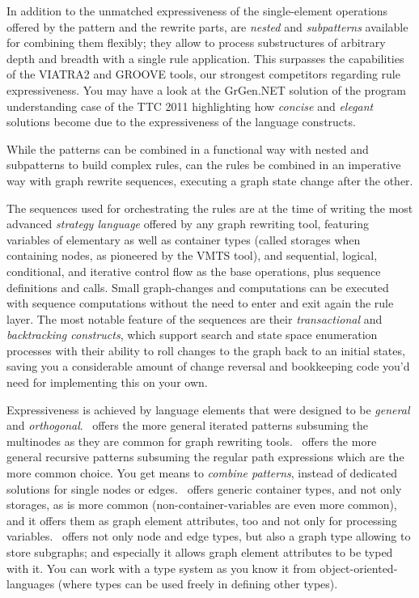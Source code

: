 In addition to the unmatched expressiveness of the single-element operations offered by the pattern and the rewrite parts,
are \emph{nested} and \emph{subpatterns} available for combining them flexibly;
they allow to process substructures of arbitrary depth and breadth with a single rule application.
This surpasses the capabilities of the VIATRA2\cite{viatra2,recursiveviatra} and GROOVE \cite{Groove} tools, our strongest competitors regarding rule expressiveness.
You may have a look at the GrGen.NET solution of the program understanding case \cite{ProgramUnderstanding} of the TTC 2011 highlighting how \emph{concise} and \emph{elegant} solutions become due to the expressiveness of the language constructs.

While the patterns can be combined in a functional way with nested and subpatterns to build complex rules, can the rules be combined in an imperative way with graph rewrite sequences, executing a graph state change after the other.

The sequences used for orchestrating the rules are at the time of writing the most advanced \emph{strategy language} offered by any graph rewriting tool, featuring variables of elementary as well as container types (called storages when containing nodes, as pioneered by the VMTS\cite{vmts} tool), and sequential, logical, conditional, and iterative control flow as the base operations, plus sequence definitions and calls.
Small graph-changes and computations can be executed with sequence computations without the need to enter and exit again the rule layer.
The most notable feature of the sequences are their \emph{transactional} and \emph{backtracking constructs}, which support search and state space enumeration processes with their ability to roll changes to the graph back to an initial states, saving you a considerable amount of change reversal and bookkeeping code you'd need for implementing this on your own.

Expressiveness is achieved by language elements that were designed to be \emph{general} and \emph{orthogonal}.
\GrG\ offers the more general iterated patterns subsuming the multinodes as they are common for graph rewriting tools.
\GrG\ offers the more general recursive patterns subsuming the regular path expressions which are the more common choice.
You get means to \emph{combine patterns}, instead of dedicated solutions for single nodes or edges.
\GrG\ offers generic container types, and not only storages, as is more common (non-container-variables are even more common), and it offers them as graph element attributes, too and not only for processing variables.
\GrG\ offers not only node and edge types, but also a graph type allowing to store subgraphs; and especially it allows graph element attributes to be typed with it.
You can work with a type system as you know it from object-oriented-languages (where types can be used freely in defining other types).

